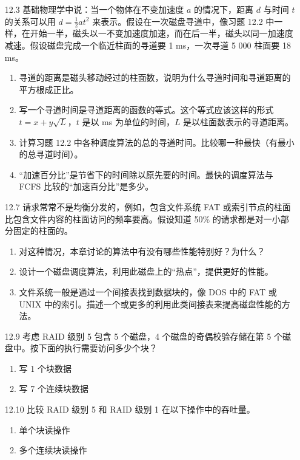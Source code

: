 \documentclass[UTF8]{ctexart}
\begin{document}
\begin{enumerate}
\begin{enumerate}
		\item[12.3] 基础物理学中说：当一个物体在不变加速度 $a$ 的情况下，距离 $d$ 与时间 $t$ 的关系可以用 $d = \frac{1}{2} a t^2$ 来表示。假设在一次磁盘寻道中，像习题 12.2 中一样，在开始一半，磁头以一不变加速度加速，而在后一半，磁头以同一加速度减速。假设磁盘完成一个临近柱面的寻道要 1 ms，一次寻道 5 000 柱面要 18 ms。
		\begin{enumerate}
			\item 寻道的距离是磁头移动经过的柱面数，说明为什么寻道时间和寻道距离的平方根成正比。
			\item 写一个寻道时间是寻道距离的函数的等式。这个等式应该这样的形式 $t = x + y \sqrt{L}$，$t$ 是以 ms 为单位的时间，$L$ 是以柱面数表示的寻道距离。
			\item 计算习题 12.2 中各种调度算法的总的寻道时间。比较哪一种最快（有最小的总寻道时间）。
			\item “加速百分比”是节省下的时间除以原先要的时间。最快的调度算法与 FCFS 比较的“加速百分比”是多少。
		\end{enumerate}
		
		\item[12.7] 请求常常不是均衡分发的，例如，包含文件系统 FAT 或索引节点的柱面比包含文件内容的柱面访问的频率要高。假设知道 50\% 的请求都是对一小部分固定的柱面的。
		\begin{enumerate}
			\item 对这种情况，本章讨论的算法中有没有哪些性能特别好？为什么？
			\item 设计一个磁盘调度算法，利用此磁盘上的“热点”，提供更好的性能。
			\item 文件系统一般是通过一个间接表找到数据块的，像 DOS 中的 FAT 或 UNIX 中的索引。描述一个或更多的利用此类间接表来提高磁盘性能的方法。
		\end{enumerate}
		
		\item[12.9] 考虑 RAID 级别 5 包含 5 个磁盘，4 个磁盘的奇偶校验存储在第 5 个磁盘中。按下面的执行需要访问多少个块？
		\begin{enumerate}
			\item 写 1 个块数据
			\item 写 7 个连续块数据
		\end{enumerate}
		
		\item[12.10] 比较 RAID 级别 5 和 RAID 级别 1 在以下操作中的吞吐量。
		\begin{enumerate}
			\item 单个块读操作
			\item 多个连续块读操作
		\end{enumerate}
		

\end{enumerate}
\end{enumerate}
\end{document}

